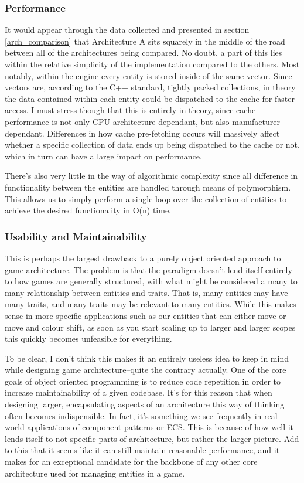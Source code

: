 \documentclass{article}
\begin{document}
\subsubsection{Performance}
It would appear through the data collected and presented in section
\ref{arch_comparison} that Architecture A sits squarely in the middle of the
road between all of the architectures being compared. No doubt, a part of this
lies within the relative simplicity of the implementation compared to the
others. Most notably, within the engine every entity is stored inside of the
same vector. Since vectors are, according to the C++ standard, tightly packed
collections, in theory the data contained within each entity could be dispatched
to the cache for faster access. I must stress though that this is entirely in
theory, since cache performance is not only CPU architecture dependant, but also
manufacturer dependant. Differences in how cache pre-fetching occurs will
massively affect whether a specific collection of data ends up being dispatched
to the cache or not, which in turn can have a large impact on performance.

There's also very little in the way of algorithmic complexity since all
difference in functionality between the entities are handled through means of
polymorphism. This allows us to simply perform a single loop over the collection
of entities to achieve the desired functionality in O(n) time.

\subsubsection{Usability and Maintainability}
This is perhaps the largest drawback to a purely object oriented approach to
game architecture. The problem is that the paradigm doesn't lend itself entirely
to how games are generally structured, with what might be considered a many to
many relationship between entities and traits. That is, many entities may
have many traits, and many traits may be relevant to many entities. While this
makes sense in more specific applications such as our entities that can either
move or move and colour shift, as soon as you start scaling up to larger and
larger scopes this quickly becomes unfeasible for everything.

To be clear, I don't think this makes it an entirely useless idea to keep in
mind while designing game architecture--quite the contrary actually. One of the
core goals of object oriented programming is to reduce code repetition in order
to increase maintainability of a given codebase. It's for this reason that when
designing larger, encapsulating aspects of an architecture this way of thinking
often becomes indispensible. In fact, it's something we see frequently in real
world applications of component patterns or ECS. This is because of how well it
lends itself to not specific parts of architecture, but rather the larger
picture. Add to this that it seems like it can still maintain reasonable
performance, and it makes for an exceptional candidate for the backbone of
any other core architecture used for managing entities in a game.
\end{document}
